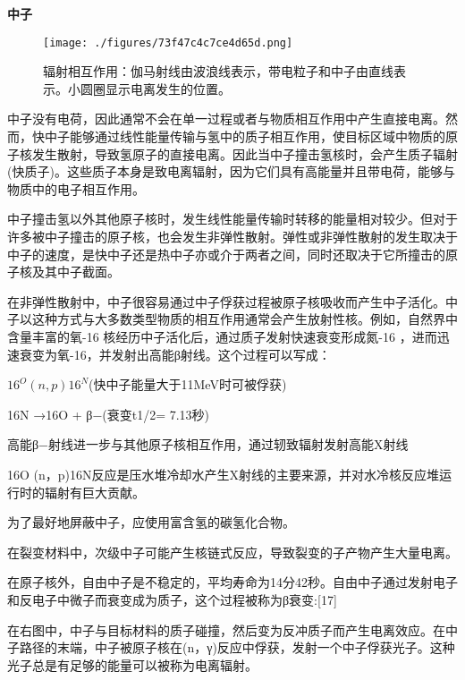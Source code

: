 \textbf{中子}

\begin{figure}[ht]
\centering
\texttt{[image: ./figures/73f47c4c7ce4d65d.png]}
\caption{辐射相互作用：伽马射线由波浪线表示，带电粒子和中子由直线表示。小圆圈显示电离发生的位置。} \label{fig_DLFS_5}
\end{figure}
中子没有电荷，因此通常不会在单一过程或者与物质相互作用中产生直接电离。然而，快中子能够通过线性能量传输与氢中的质子相互作用，使目标区域中物质的原子核发生散射，导致氢原子的直接电离。因此当中子撞击氢核时，会产生质子辐射(快质子)。这些质子本身是致电离辐射，因为它们具有高能量并且带电荷，能够与物质中的电子相互作用。

中子撞击氢以外其他原子核时，发生线性能量传输时转移的能量相对较少。但对于许多被中子撞击的原子核，也会发生非弹性散射。弹性或非弹性散射的发生取决于中子的速度，是快中子还是热中子亦或介于两者之间，同时还取决于它所撞击的原子核及其中子截面。

在非弹性散射中，中子很容易通过中子俘获过程被原子核吸收而产生中子活化。中子以这种方式与大多数类型物质的相互作用通常会产生放射性核。例如，自然界中含量丰富的氧-16 核经历中子活化后，通过质子发射快速衰变形成氮-16 ，进而迅速衰变为氧-16，并发射出高能β射线。这个过程可以写成：

$16^O (n,p)16^N$(快中子能量大于11MeV时可被俘获)

16N →16O + β−(衰变t1/2= 7.13秒)

高能β−射线进一步与其他原子核相互作用，通过轫致辐射发射高能X射线

16O (n，p)16N反应是压水堆冷却水产生X射线的主要来源，并对水冷核反应堆运行时的辐射有巨大贡献。

为了最好地屏蔽中子，应使用富含氢的碳氢化合物。

在裂变材料中，次级中子可能产生核链式反应，导致裂变的子产物产生大量电离。

在原子核外，自由中子是不稳定的，平均寿命为14分42秒。自由中子通过发射电子和反电子中微子而衰变成为质子，这个过程被称为β衰变:[17]

在右图中，中子与目标材料的质子碰撞，然后变为反冲质子而产生电离效应。在中子路径的末端，中子被原子核在(n，γ)反应中俘获，发射一个中子俘获光子。这种光子总是有足够的能量可以被称为电离辐射。